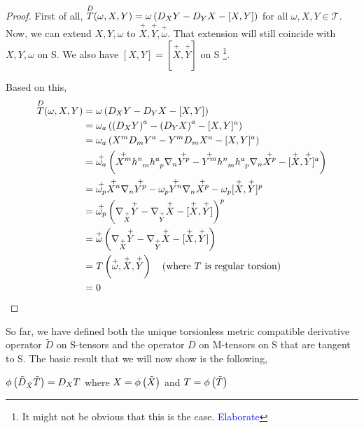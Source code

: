 \begin{proof}
    First of all, $\overset{D}{T}(\omega, X, Y) = \omega\left( D_X Y - D_Y X - [X, Y] \right)$ for all $ \omega, X, Y \in \mathscr{T}$. Now, we can extend $X, Y, \omega$ to $\overset{+}{X}, \overset{+}{Y}, \overset{+}{ \omega}$. That extension will still coincide with $X, Y, \omega$ on S. We also have $[X, Y] = [\overset{+}{X}, \overset{+}{Y}]$ on S \footnote{ It might not be obvious that this is the case. \textcolor{blue}{Elaborate}}.

Based on this,
\begin{align*}
	\overset{D}{T}(\omega, X, Y) &= \omega\lera{D_X Y - D_Y X - [X, Y]} \\
	&= \omega_a \left(\lera{D_X Y}^a - \lera{D_Y X}^a - [X, Y]^a\right) \\
	&= \omega_a \lera{X^m D_m Y^a - Y^m D_m X^a - [X, Y]^a} \\
	&= \overset{+}{\omega_a} \lera{\overset{+}{X^m} \tt{h}{n}{m} \tt{h}{a}{p} \nabla_n \overset{+}{Y^p} - \overset{+}{Y^m} \tt{h}{n}{m} \tt{h}{a}{p} \nabla_n \overset{+}{X^p} - [\overset{+}{X}, \overset{+}{Y}]^a} \\
	&= \overset{+}{\omega_p} \overset{+}{X^n} \nabla_n \overset{+}{Y^p} - \omega_p \overset{+}{Y^n} \nabla_n \overset{+}{X^p} - \omega_p [\overset{+}{X}, \overset{+}{Y}]^p \\
	&= \overset{+}{\omega_p} \lera{\nabla_{\overset{+}{X}} \overset{+}{Y} - \nabla_{\overset{+}{Y}} \overset{+}{X} - [\overset{+}{X}, \overset{+}{Y}]}^p \\
	&= \overset{+}{\omega}\lera{\nabla_{\overset{+}{X}} \overset{+}{Y} - \nabla_{\overset{+}{Y}} \overset{+}{X} - [\overset{+}{X}, \overset{+}{Y}]} \\
	&= T\lera{\overset{+}{\omega}, \overset{+}{X}, \overset{+}{Y}} \quad \text{(where $T$ is regular torsion)} \\
	&= 0
\end{align*}
\end{proof}

So far, we have defined both the unique torsionless metric compatible derivative operator $ \tilde{D}$ on S-tensors and the operator $ D$ on M-tensors on S that are tangent to S. The basic result that we will now show is the following,

\begin{proposition}
  $\phi \left( \tilde{D}_{\tilde{X}} \tilde{T} \right) = D_X T $ where $X = \phi\left( \tilde{X} \right)$ and $T = \phi \left(  \tilde{T} \right)$  
\end{proposition}

